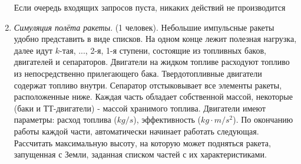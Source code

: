 \documentclass[12pt]{report}
\begin{document}
\begin{enumerate}
Если очередь входящих запросов пуста, никаких действий не производится
  \item \emph{Симуляция полёта ракеты}. (1 человек). 
Небольшие импульсные ракеты удобно представить в виде списков. На одном конце 
лежит полезная нагрузка, далее идут $k$-тая, ..., 2-я, 1-я ступени, состоящие 
из топливных баков, двигателей и сепараторов. Двигатели на жидком топливе 
расходуют топливо из непосредственно прилегающего бака. Твердотопливные 
двигатели содержат топливо внутри. Сепаратор отстыковывает все элементы ракеты, 
расположенные ниже. Каждая часть обладает собственной массой, некоторые (баки и 
ТТ-двигатели) - массой хранимого топлива. Двигатели имеют параметры: расход 
топлива ($kg/s$), эффективность ($kg\cdot{}m/s^2$). По окончанию работы каждой 
части, автоматически начинает работать следующая.
Рассчитать максимальную высоту, на которую может подняться ракета, запущенная с 
Земли, заданная списком частей с их характеристиками.
 \end{enumerate}
\end{document}
